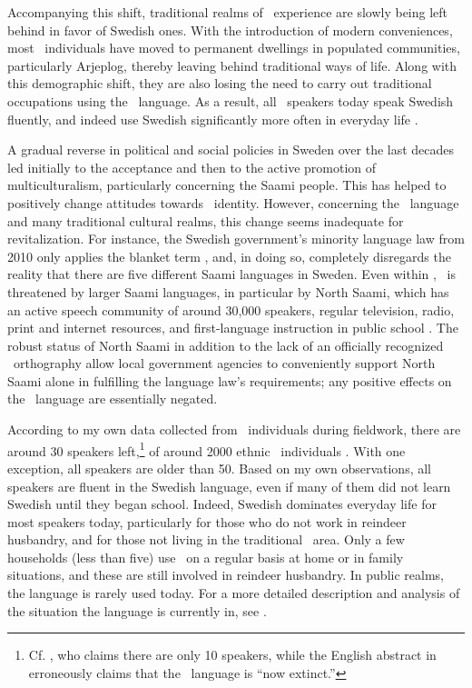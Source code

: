 Accompanying this shift, traditional realms of \PS\ experience are slowly being left behind in favor of Swedish ones. With the introduction of modern conveniences, most \PS\ individuals have moved to permanent dwellings in populated communities, particularly Arjeplog, thereby leaving behind traditional ways of life. Along with this demographic shift, they are also losing the need to carry out traditional occupations using the \PS\ language. As a result, all \PS\ speakers today speak Swedish fluently, and indeed use Swedish significantly more often in everyday life \citep[cf.][]{ValijarviWilbur2011}.

A gradual reverse in political and social policies in Sweden over the last decades led initially to the acceptance and then to the active promotion of multiculturalism, particularly concerning the Saami people. This has helped to positively change attitudes towards \PS\ identity. However, concerning the \PS\ language and many traditional cultural realms, this change seems inadequate for revitalization. For instance, the Swedish government's minority language law from 2010 only applies the blanket term , and, in doing so, completely disregards the reality that there are five different Saami languages in Sweden. Even within , \PS\ is threatened by larger Saami languages, in particular by North Saami, which has an active speech community of around 30,000 speakers, regular television, radio, print and internet resources, and first-language instruction in public school \citep[cf.][209-211]{Salminen2007}. The robust status of North Saami in addition to the lack of an officially recognized \PS\ orthography allow local government agencies to conveniently support North Saami alone in fulfilling the language law's requirements; any positive effects on the \PS\ language are essentially negated.

According to my own data collected from \PS\ individuals during fieldwork, there are around 30 speakers left,\footnote{Cf. \citet[221]{Salminen2007}, who claims there are only 10 speakers, while the English abstract in \citet{Lehtiranta1992} erroneously claims that the \PS\ language is “now extinct.”} 
of around 2000 ethnic \PS\ individuals \citep[24]{Krauss1997}. With one exception, all speakers are older than 50. %
Based on my own observations, all speakers are fluent in the Swedish language, even if many of them did not learn Swedish until they began school. Indeed, Swedish dominates everyday life for most speakers today, particularly for those who do not work in reindeer husbandry, and for those not living in the traditional \PS\ area. Only a few households (less than five) use \PS\ on a regular basis at home or in family situations, and these are still involved in reindeer husbandry. In public realms, the language is rarely used today. For a more detailed description and analysis of the situation the language is currently in, see \citet{ValijarviWilbur2011}.


